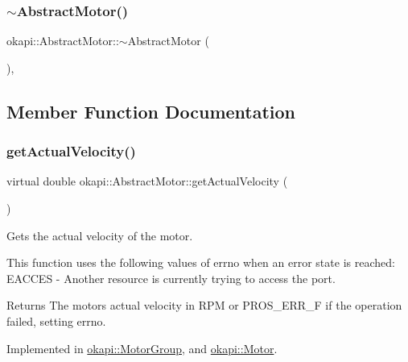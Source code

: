 \subsubsection{\texorpdfstring{$\sim$AbstractMotor()}{~AbstractMotor()}}
{\footnotesize\ttfamily okapi\+::\+Abstract\+Motor\+::$\sim$\+Abstract\+Motor (\begin{DoxyParamCaption}{ }\end{DoxyParamCaption})\hspace{0.3cm}{\ttfamily [virtual]}, {\ttfamily [default]}}



\subsection{Member Function Documentation}
\mbox{\label{classokapi_1_1AbstractMotor_a45b2013cc318577fad4ac38ad22ce219}} 
\subsubsection{\texorpdfstring{getActualVelocity()}{getActualVelocity()}}
{\footnotesize\ttfamily virtual double okapi\+::\+Abstract\+Motor\+::get\+Actual\+Velocity (\begin{DoxyParamCaption}{ }\end{DoxyParamCaption})\hspace{0.3cm}{\ttfamily [pure virtual]}}

Gets the actual velocity of the motor.

This function uses the following values of errno when an error state is reached\+: E\+A\+C\+C\+ES -\/ Another resource is currently trying to access the port.

\begin{DoxyReturn}{Returns}
The motor\textquotesingle{}s actual velocity in R\+PM or P\+R\+O\+S\+\_\+\+E\+R\+R\+\_\+F if the operation failed, setting errno. 
\end{DoxyReturn}


Implemented in \mbox{\hyperlink{classokapi_1_1MotorGroup_a5cbb95146d4663440632a9e3ccc99ae9}{okapi\+::\+Motor\+Group}}, and \mbox{\hyperlink{classokapi_1_1Motor_a12dab94ff8e0636c01d3c568d9461655}{okapi\+::\+Motor}}.

\mbox{\label{classokapi_1_1AbstractMotor_a157407c39c952a7c2eb497bddb868c93}} 
